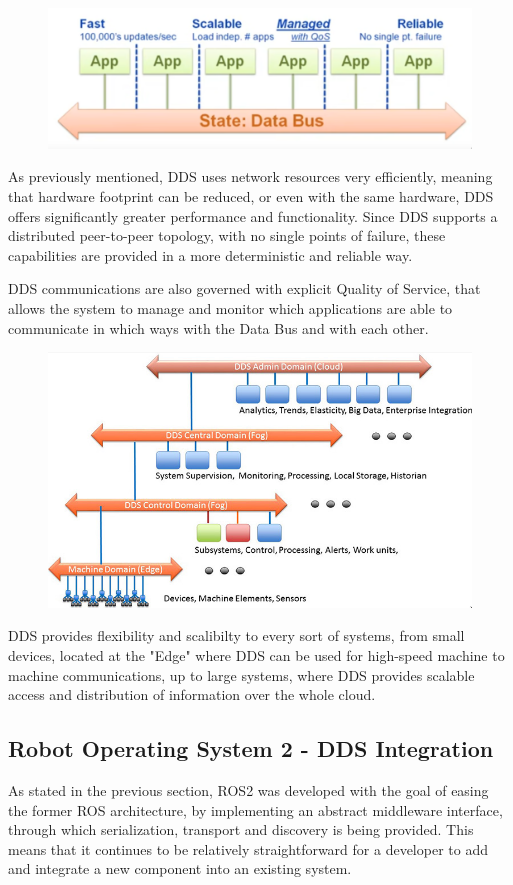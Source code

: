 \begin{figure}[H]
    \centering
    \includegraphics[width=0.5\linewidth]{images/dds-architecture.png}
\end{figure}

As previously mentioned, DDS uses network resources very efficiently, meaning that hardware footprint can be reduced, or even with the same hardware, DDS offers significantly greater performance and functionality. Since DDS supports a distributed peer-to-peer topology, with no single points of failure, these capabilities are provided in a more deterministic and reliable way.

DDS communications are also governed with explicit Quality of Service, that allows the system to manage and monitor which applications are able to communicate in which ways with the Data Bus and with each other. 

\begin{figure}[H]
    \centering
     \includegraphics[width=0.5\linewidth]{images/dds-scalable-architecture.png}
\end{figure}

DDS provides flexibility and scalibilty to every sort of systems, from small devices, located at the "Edge" where DDS can be used for high-speed machine to machine communications, up to large systems, where DDS provides scalable access and distribution of information over the whole cloud.


\subsection{Robot Operating System 2 - DDS Integration}

As stated in the previous section, ROS2 was developed with the goal of easing the former ROS architecture, by implementing an abstract middleware interface, through which serialization, transport and discovery is being provided. This means that it continues to be relatively straightforward for a developer to add and integrate a new component into an existing system.

